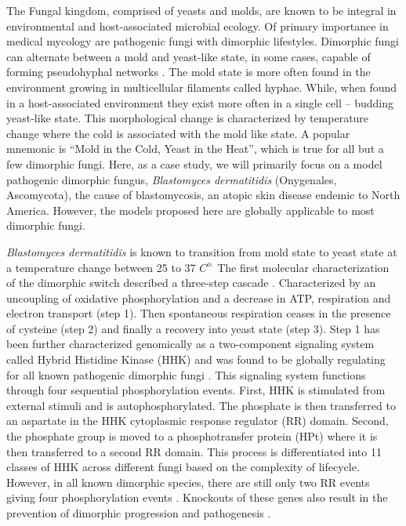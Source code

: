 \documentclass[preprint,12pt]{elsarticle}
\begin{document}
The Fungal kingdom, comprised of yeasts and molds, are known to be integral in environmental and host-associated microbial ecology. Of primary importance in medical mycology are pathogenic fungi with dimorphic lifestyles. Dimorphic fungi can alternate between a mold and yeast-like state, in some cases, capable of forming pseudohyphal networks \cite{Veses2009-ly}. The mold state is more often found in the environment growing in multicellular filaments called hyphae. While, when found in a host-associated environment they exist more often in a single cell -- budding yeast-like state. This morphological change is characterized by temperature change where the cold is associated with the mold like state. A popular mnemonic is “Mold in the Cold, Yeast in the Heat”, which is true for all but a few dimorphic fungi. Here, as a case study, we will primarily focus on a model pathogenic dimorphic fungus, \textit{Blastomyces dermatitidis} (Onygenales, Ascomycota), the cause of blastomycosis, an atopic skin disease endemic to North America. However, the models proposed here are globally applicable to most dimorphic fungi. \\ \par

\textit{Blastomyces dermatitidis} is known to transition from mold state to yeast state at a temperature change between 25 to 37 $C^{o.}$ The first molecular characterization of the dimorphic switch described a three-step cascade \citep{Medoff1987-kt}. Characterized by an uncoupling of oxidative phosphorylation and a decrease in ATP, respiration and electron transport (step 1). Then spontaneous respiration ceases in the presence of cysteine (step 2) and finally a recovery into yeast state (step 3).  Step 1 has been further characterized genomically as a two-component signaling system called Hybrid Histidine Kinase (HHK) and was found to be globally regulating for all known pathogenic dimorphic fungi \citep{Nemecek2006-ff}. This signaling system functions through four sequential phosphorylation events. First, HHK is stimulated from external stimuli and is autophosphorylated. The phosphate is then transferred to an aspartate in the HHK cytoplasmic response regulator (RR) domain. Second, the phosphate group is moved to a phosphotransfer protein (HPt) where it is then transferred to a second RR domain. This process is differentiated into 11 classes of HHK across different fungi based on the complexity of lifecycle.  However, in all known dimorphic species, there are still only two RR events giving four phosphorylation events \citep{Catlett2003-mn}. Knockouts of these genes also result in the prevention of dimorphic progression and pathogenesis \citep{Nemecek2006-ff}. \\ \par
\end{document}
